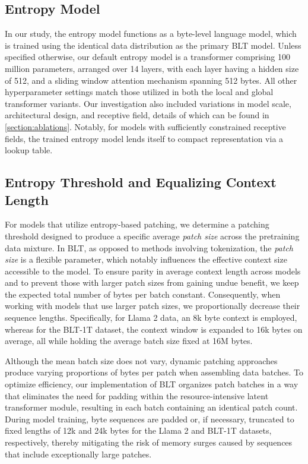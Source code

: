 \subsection{Entropy Model} In our study, the entropy model functions as a byte-level language model, which is trained using the identical data distribution as the primary {\textsc BLT} model. Unless specified otherwise, our default entropy model is a transformer comprising 100 million parameters, arranged over 14 layers, with each layer having a hidden size of 512, and a sliding window attention mechanism spanning 512 bytes. All other hyperparameter settings match those utilized in both the local and global transformer variants. Our investigation also included variations in model scale, architectural design, and receptive field, details of which can be found in \autoref{section:ablations}. Notably, for models with sufficiently constrained receptive fields, the trained entropy model lends itself to compact representation via a lookup table.

\subsection{Entropy Threshold and Equalizing Context Length}  
For models that utilize entropy-based patching, we determine a patching threshold designed to produce a specific average \textit{patch size} across the pretraining data mixture. In {\textsc BLT}, as opposed to methods involving tokenization, the \textit{patch size} is a flexible parameter, which notably influences the effective context size accessible to the model. To ensure parity in average context length across models and to prevent those with larger patch sizes from gaining undue benefit, we keep the expected total number of bytes per batch constant. Consequently, when working with models that use larger patch sizes, we proportionally decrease their sequence lengths. Specifically, for Llama 2 data, an 8k byte context is employed, whereas for the {\textsc BLT}-1T dataset, the context window is expanded to 16k bytes on average, all while holding the average batch size fixed at 16M bytes.

Although the mean batch size does not vary, dynamic patching approaches produce varying proportions of bytes per patch when assembling data batches. To optimize efficiency, our implementation of {\textsc BLT} organizes patch batches in a way that eliminates the need for padding within the resource-intensive latent transformer module, resulting in each batch containing an identical patch count. During model training, byte sequences are padded or, if necessary, truncated to fixed lengths of 12k and 24k bytes for the Llama 2 and {\textsc BLT}-1T datasets, respectively, thereby mitigating the risk of memory surges caused by sequences that include exceptionally large patches.

